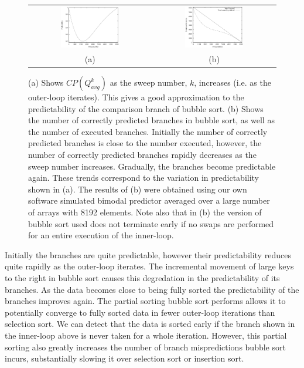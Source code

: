 \documentclass[acmtocl]{acmtrans2m}
\begin{document}
\begin{figure}
\centering
\begin{tabular}{cc}
\includegraphics[width=0.5\textwidth]{plots/bubble_predictability.eps} & \includegraphics[width=0.5\textwidth]{plots/bubble_sweep_misses.eps} \\
(a) & (b) \\
\end{tabular}
\caption{(a) Shows $CP(Q^k_{avg})$ as the sweep number, $k$, increases (i.e. as the outer-loop iterates). This gives a good approximation to the 
predictability of the comparison branch of bubble sort. (b) Shows the number of correctly predicted branches in bubble sort, as well as the number of executed branches.
Initially the number of correctly predicted branches is close to the number executed, however, the number of correctly predicted branches rapidly 
decreases as the sweep number increases. Gradually, the branches become predictable again. These trends correspond to the 
variation in predictability shown in (a). The results of (b)
were obtained using our own software simulated bimodal predictor averaged over a large number of arrays with 8192 elements. Note also that in (b) 
the version of bubble sort used does not terminate early if no swaps are performed for an entire execution of the inner-loop.  }
\label{bubble_predictability}
\end{figure}


Initially the branches
are quite predictable, however their predictability reduces quite rapidly as the outer-loop iterates.
The incremental movement of large keys to the right in bubble sort causes this degredation in the
predictability of its branches. As the data becomes close to being
fully sorted the predictability of the branches improves again. The partial sorting bubble sort performs allows it to potentially converge to 
fully sorted data in fewer outer-loop iterations than selection sort. We can
detect that the data is sorted early if the branch shown in the inner-loop above
is never taken for a whole iteration. However, this partial sorting also greatly increases
the number of branch mispredictions bubble sort incurs, substantially slowing it over selection sort or insertion sort.
\end{document}
